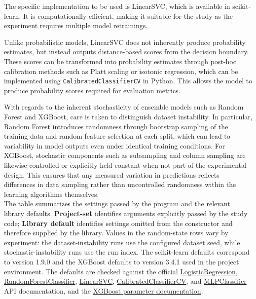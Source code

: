 \documentclass[12pt]{article}
\begin{document}
\begin{enumerate}
  The specific implementation to be used is LinearSVC, which is available in scikit-learn. It is computationally efficient, making it suitable for the study as the experiment requires multiple model retrainings.

  Unlike probabilistic models, LinearSVC does not inherently produce probability estimates, but instead outputs distance-based scores from the decision boundary. These scores can be transformed into probability estimates through post-hoc calibration methods such as Platt scaling or isotonic regression, which can be implemented using \texttt{CalibratedClassifierCV} in Python. This allows the model to produce probability scores required for evaluation metrics.
\end{enumerate}

With regards to the inherent stochasticity of ensemble models such as Random Forest and XGBoost, care is taken to distinguish dataset instability. In particular, Random Forest introduces randomness through bootstrap sampling of the training data and random feature selection at each split, which can lead to variability in model outputs even under identical training conditions. For XGBoost, stochastic components such as subsampling and column sampling are likewise controlled or explicitly held constant when not part of the experimental design. This ensures that any measured variation in predictions reflects differences in data sampling rather than uncontrolled randomness within the learning algorithms themselves. \\

The table summarizes the settings passed by the program and the relevant library defaults. \textbf{Project-set} identifies arguments explicitly passed by the study code; \textbf{Library default} identifies settings omitted from the constructor and therefore supplied by the library. Values in the random-state rows vary by experiment: the dataset-instability runs use the configured dataset seed, while stochastic-instability runs use the run index. The scikit-learn defaults correspond to version 1.9.0 and the XGBoost defaults to version 3.4.1 used in the project environment. The defaults are checked against the official \href{https://scikit-learn.org/stable/modules/generated/sklearn.linear_model.LogisticRegression.html}{LogisticRegression}, \href{https://scikit-learn.org/stable/modules/generated/sklearn.ensemble.RandomForestClassifier.html}{RandomForestClassifier}, \href{https://scikit-learn.org/stable/modules/generated/sklearn.svm.LinearSVC.html}{LinearSVC}, \href{https://scikit-learn.org/stable/modules/generated/sklearn.calibration.CalibratedClassifierCV.html}{CalibratedClassifierCV}, and \href{https://scikit-learn.org/stable/modules/generated/sklearn.neural_network.MLPClassifier.html}{MLPClassifier} API documentation, and the \href{https://xgboost.readthedocs.io/en/stable/parameter.html}{XGBoost parameter documentation}.
\end{document}
